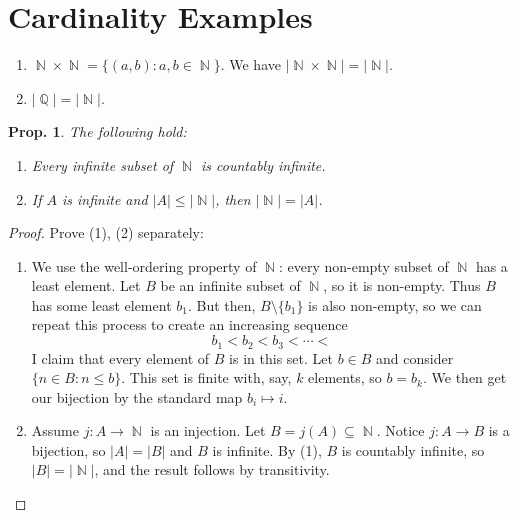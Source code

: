 \documentclass[12pt, a4paper]{book}
\DeclareMathOperator{\N}{\mathbb{N}}
\DeclareMathOperator{\Q}{\mathbb{Q}}
\newtheorem{proposition}[theorem]{Prop.}
\theoremstyle{nonumberplain}
\newtheorem{proof}{Proof}
\begin{document}
\section{Cardinality Examples}
\begin{enumerate}
    \item $\N\times\N=\{(a,b):a,b\in\N\}$. We have $|\N\times\N|=|\N|$.
    \item $|\Q|=|\N|$.
\end{enumerate}
\begin{proposition} The following hold:
    \begin{enumerate}[label=(\arabic*)]
        \item Every infinite subset of $\N$ is countably infinite.
        \item If $A$ is infinite and $|A|\leq|\N|$, then $|\N|=|A|$.
    \end{enumerate}
\end{proposition}
\begin{proof} Prove (1), (2) separately:
    \begin{enumerate}[label=(\arabic*)]
        \item We use the well-ordering property of $\N$: every non-empty subset of $\N$ has a least element. Let $B$
            be an infinite subset of $\N$, so it is non-empty. Thus $B$ has some least element $b_1$. But then, $B\setminus\{b_1\}$
            is also non-empty, so we can repeat this process to create an increasing sequence
            \[b_1<b_2<b_3<\cdots<\]
            I claim that every element of $B$ is in this set. Let $b\in B$ and consider $\{n\in B:n\leq b\}$. This set is
            finite with, say, $k$ elements, so $b=b_k$. We then get our bijection by the standard map $b_i\mapsto i$.
        \item Assume $j:A\to\N$ is an injection. Let $B=j(A)\subseteq\N$. Notice $j:A\to B$ is a bijection, so $|A|=|B|$
            and $B$ is infinite. By (1), $B$ is countably infinite, so $|B|=|\N|$, and the result follows by transitivity.
    \end{enumerate}
\end{proof}
\end{document}
